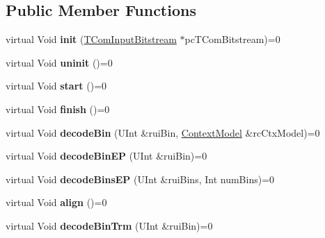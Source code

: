 \subsection*{Public Member Functions}
\begin{DoxyCompactItemize}
\item 
\mbox{\label{class_t_dec_bin_if_a36c11a219dfaf7ea8acd7fb56aee4751}} 
virtual Void {\bfseries init} (\hyperlink{class_t_com_input_bitstream}{T\+Com\+Input\+Bitstream} $\ast$pc\+T\+Com\+Bitstream)=0
\item 
\mbox{\label{class_t_dec_bin_if_ae7d4c5e4d14e295e5b21d26032b82c9a}} 
virtual Void {\bfseries uninit} ()=0
\item 
\mbox{\label{class_t_dec_bin_if_aa79217bac713acad8911cc36aec319b9}} 
virtual Void {\bfseries start} ()=0
\item 
\mbox{\label{class_t_dec_bin_if_aa0e440edf00517dab9f658b9c7ca7981}} 
virtual Void {\bfseries finish} ()=0
\item 
\mbox{\label{class_t_dec_bin_if_a878c5846b800c2c7c485e294f49452f9}} 
virtual Void {\bfseries decode\+Bin} (U\+Int \&rui\+Bin, \hyperlink{class_context_model}{Context\+Model} \&rc\+Ctx\+Model)=0
\item 
\mbox{\label{class_t_dec_bin_if_a6fc215dc79ae9ea86ec437ff3943f7d7}} 
virtual Void {\bfseries decode\+Bin\+EP} (U\+Int \&rui\+Bin)=0
\item 
\mbox{\label{class_t_dec_bin_if_ad8fbeeae890fcfa7717659bd574f7808}} 
virtual Void {\bfseries decode\+Bins\+EP} (U\+Int \&rui\+Bins, Int num\+Bins)=0
\item 
\mbox{\label{class_t_dec_bin_if_a69790920a53dadb6d48a658791ecdf3a}} 
virtual Void {\bfseries align} ()=0
\item 
\mbox{\label{class_t_dec_bin_if_aa748a8203829a843a17f6b4428c095b4}} 
virtual Void {\bfseries decode\+Bin\+Trm} (U\+Int \&rui\+Bin)=0
\item 
\mbox{\label{class_t_dec_bin_if_a56fecccf85c7a86ec313f75f2c41caf1}} 

\end{DoxyCompactItemize}
